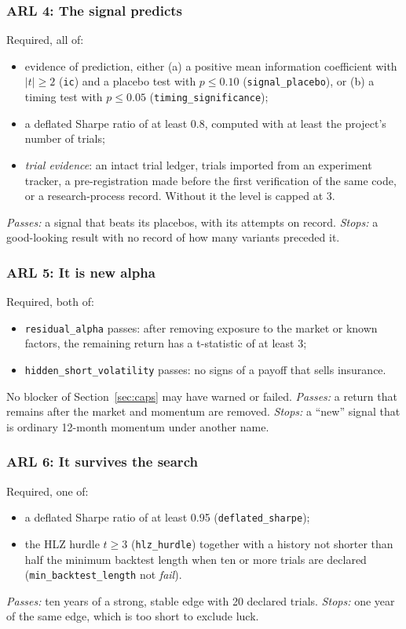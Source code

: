 \documentclass[11pt]{article}
\newcommand{\chk}[1]{\texttt{#1}}
\newcommand{\lvl}[2]{\subsubsection*{ARL #1: #2}}
\begin{document}
\lvl{4}{The signal predicts}
Required, all of:
\begin{itemize}
\item evidence of prediction, either (a) a positive mean information coefficient with $|t|\ge 2$ (\chk{ic}) and a
placebo test with $p\le 0.10$ (\chk{signal\_placebo}), or (b) a timing test with $p\le 0.05$
(\chk{timing\_significance});
\item a deflated Sharpe ratio of at least 0.8, computed with at least the project's number of trials;
\item \emph{trial evidence}: an intact trial ledger, trials imported from an experiment tracker, a pre-registration made
before the first verification of the same code, or a research-process record. Without it the level is capped at 3.
\end{itemize}
\emph{Passes:} a signal that beats its placebos, with its attempts on record. \emph{Stops:} a good-looking result with
no record of how many variants preceded it.

\lvl{5}{It is new alpha}
Required, both of:
\begin{itemize}
\item \chk{residual\_alpha} passes: after removing exposure to the market or known factors, the remaining return has a
t-statistic of at least 3;
\item \chk{hidden\_short\_volatility} passes: no signs of a payoff that sells insurance.
\end{itemize}
No blocker of Section~\ref{sec:caps} may have warned or failed. \emph{Passes:} a return that remains after the market
and momentum are removed. \emph{Stops:} a ``new'' signal that is ordinary 12-month momentum under another name.

\lvl{6}{It survives the search}
Required, one of:
\begin{itemize}
\item a deflated Sharpe ratio of at least 0.95 (\chk{deflated\_sharpe});
\item the HLZ hurdle $t\ge 3$ (\chk{hlz\_hurdle}) together with a history not shorter than half the minimum backtest
length when ten or more trials are declared (\chk{min\_backtest\_length} not \emph{fail}).
\end{itemize}
\emph{Passes:} ten years of a strong, stable edge with 20 declared trials. \emph{Stops:} one year of the same edge,
which is too short to exclude luck.
\end{document}

